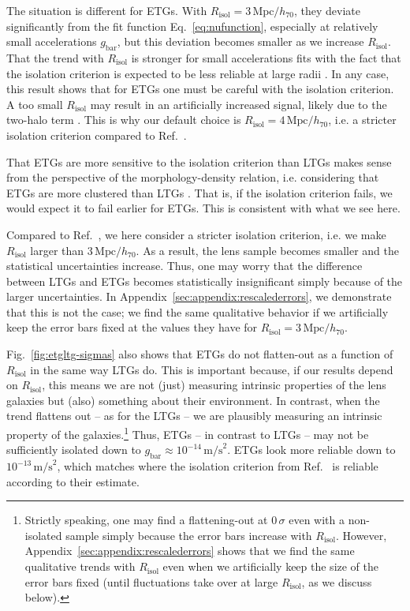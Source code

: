 \documentclass[a4paper,11pt]{article}
\newcommand{\gbar}{\ensuremath{g_{\mathrm{bar}}}}
\begin{document}
%
%
%
%
%
%
%
%
%

The situation is different for ETGs.
With $R_{\mathrm{isol}} = 3\,\mathrm{Mpc}/h_{70}$, they deviate significantly from the fit function Eq.~\eqref{eq:nufunction}, especially at relatively small accelerations $g_{\mathrm{bar}}$, but this deviation becomes smaller as we increase $R_{\mathrm{isol}}$.
That the trend with $R_{\mathrm{isol}}$ is stronger for small accelerations fits with the fact that the isolation criterion is expected to be less reliable at large radii \citep{Brouwer2021}.
In any case, this result shows that for ETGs one must be careful with the isolation criterion.
A too small $R_{\mathrm{isol}}$ may result in an artificially increased signal, likely due to the two-halo term \citep{Brouwer2021}.
This is why our default choice is $R_{\mathrm{isol}} = 4\,\mathrm{Mpc}/h_{70}$, i.e. a stricter isolation criterion compared to Ref.~\cite{Brouwer2021}.

That ETGs are more sensitive to the isolation criterion than LTGs makes sense from the perspective of the morphology-density relation, i.e. considering that ETGs are more clustered than LTGs \citep{Dressler1980}.
That is, if the isolation criterion fails, we would expect it to fail earlier for ETGs.
This is consistent with what we see here.

Compared to Ref.~\cite{Brouwer2021}, we here consider a stricter isolation criterion, i.e. we make $R_{\mathrm{isol}}$ larger than $3\,\mathrm{Mpc}/h_{70}$.
As a result, the lens sample becomes smaller and the statistical uncertainties increase.
Thus, one may worry that the difference between LTGs and ETGs becomes statistically insignificant simply because of the larger uncertainties.
In Appendix~\ref{sec:appendix:rescalederrors}, we demonstrate that this is not the case; we find the same qualitative behavior if we artificially keep the error bars fixed at the values they have for $R_{\mathrm{isol}} = 3\,\mathrm{Mpc}/h_{70}$.

Fig.~\ref{fig:etgltg-sigmas} also shows that ETGs do not flatten-out as a function of $R_{\mathrm{isol}}$ in the same way LTGs do.
This is important because, if our results depend on $R_{\mathrm{isol}}$, this means we are not (just) measuring intrinsic properties of the lens galaxies but (also) something about their environment.
In contrast, when the trend flattens out -- as for the LTGs -- we are plausibly measuring an intrinsic property of the galaxies.\footnote{
  Strictly speaking, one may find a flattening-out at $0\,\sigma$ even with a non-isolated sample simply because the error bars increase with $R_{\mathrm{isol}}$.
  However, Appendix~\ref{sec:appendix:rescalederrors} shows that we find the same qualitative trends with $R_{\mathrm{isol}}$ even when we artificially keep the size of the error bars fixed (until fluctuations take over at large $R_{\mathrm{isol}}$, as we discuss below).
}
Thus, ETGs -- in contrast to LTGs -- may not be sufficiently isolated down to $\gbar \approx 10^{-14}\,\mathrm{m/s}^2$.
ETGs look more reliable down to $10^{-13}\,\mathrm{m/s}^2$, which matches where the isolation criterion from Ref.~\cite{Brouwer2021} is reliable according to their estimate.
\end{document}

